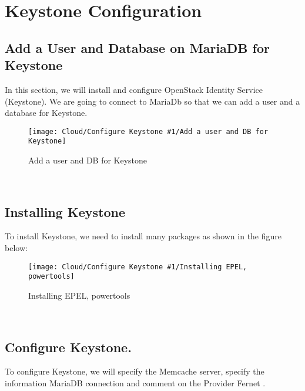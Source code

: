 \chapter{Keystone Configuration}
\begin{spacing}{1.2}
\section{Add a User and Database on MariaDB for Keystone}

\par In this section, we will install and configure OpenStack Identity Service (Keystone). We
are going to connect to MariaDb so that we can add a user and a database
for Keystone. 
\\
\begin{figure}[!htb] 
\begin{center} 
\texttt{[image: Cloud/Configure Keystone \#1/Add a user and DB for Keystone]} 
\end{center} 
\caption{Add a user and DB for Keystone} 
\end{figure}  \FloatBarrier
\\


\section{Installing Keystone}

\par To install Keystone, we need to install many packages as shown in the
figure below: 
\\
\begin{figure}[!htb] 
\begin{center} 
\texttt{[image: Cloud/Configure Keystone \#1/Installing EPEL, powertools]} 
\end{center} 
\caption{Installing EPEL, powertools} 
\end{figure}  \FloatBarrier
\\


\section{Configure Keystone.}

\par To configure Keystone, we will specify the Memcache server, specify the information
MariaDB connection and comment on the Provider Fernet .\\


\end{spacing}
